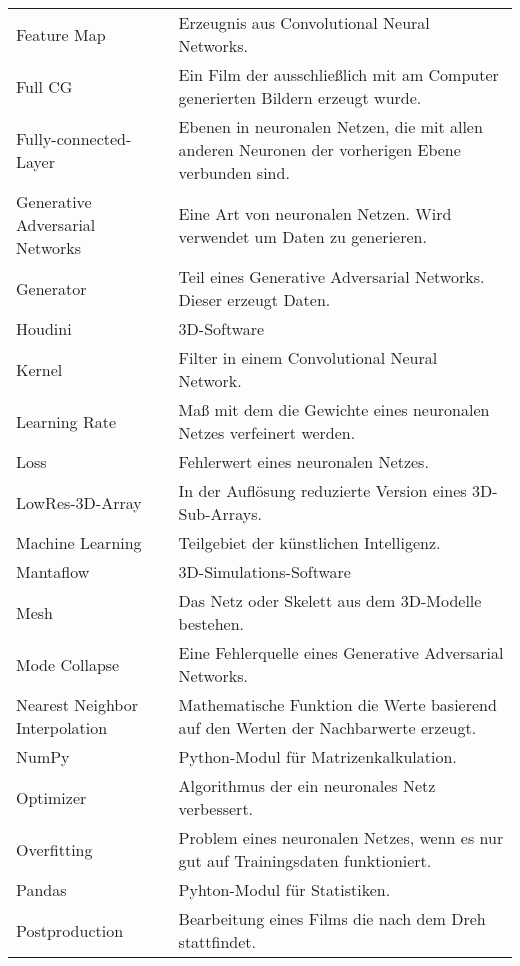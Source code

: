\begin{table}[ht]
    \begin{tabularx}{\textwidth}{lX}
        Feature Map	&	Erzeugnis aus Convolutional Neural Networks.	\\
    Full CG & Ein Film der ausschließlich mit am Computer generierten Bildern erzeugt wurde.\\
Fully-connected-Layer	&	Ebenen in neuronalen Netzen, die mit allen anderen Neuronen der vorherigen Ebene verbunden sind.	\\
    Generative Adversarial Networks	&	Eine Art von neuronalen Netzen. Wird verwendet um Daten zu generieren.	\\
Generator	&	Teil eines Generative Adversarial Networks. Dieser erzeugt Daten.\\
    Houdini	&	3D-Software 	\\
Kernel	&	Filter in einem Convolutional Neural Network.	\\
Learning Rate	&	Maß mit dem die Gewichte eines neuronalen Netzes verfeinert werden. \\
Loss	&	Fehlerwert eines neuronalen Netzes.	\\
LowRes-3D-Array	&	In der Auflösung reduzierte Version eines 3D-Sub-Arrays.	\\
Machine Learning	&	Teilgebiet der künstlichen Intelligenz.	\\
Mantaflow	&	3D-Simulations-Software	\\
Mesh & Das Netz oder Skelett aus dem 3D-Modelle bestehen.\\
Mode Collapse	&	Eine Fehlerquelle eines Generative Adversarial Networks.	\\
Nearest Neighbor Interpolation	&	Mathematische Funktion die Werte basierend auf den Werten der Nachbarwerte erzeugt.	\\
NumPy	&	Python-Modul für Matrizenkalkulation.	\\
Optimizer	&	Algorithmus der ein neuronales Netz verbessert.	\\
Overfitting	&	Problem eines neuronalen Netzes, wenn es nur gut auf Trainingsdaten funktioniert.	\\
Pandas	&	Pyhton-Modul für Statistiken.	\\
Postproduction & Bearbeitung eines Films die nach dem Dreh stattfindet. \\


    \end{tabularx}
    \label{tab:my_label2}
\end{table}

